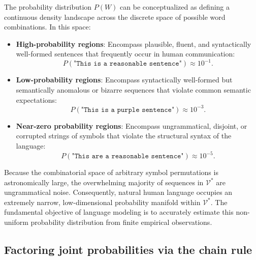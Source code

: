 \documentclass[../../main.tex]{subfiles}
\begin{document}
The probability distribution $P(W)$ can be conceptualized as defining a continuous density landscape across the discrete space of possible word combinations. In this space:
\begin{itemize}
    \item \textbf{High-probability regions}: Encompass plausible, fluent, and syntactically well-formed sentences that frequently occur in human communication:
    \begin{equation}
    P\left(\texttt{"This is a reasonable sentence"}\right) \approx 10^{-1}.
    \end{equation}
    \item \textbf{Low-probability regions}: Encompass syntactically well-formed but semantically anomalous or bizarre sequences that violate common semantic expectations:
    \begin{equation}
    P\left(\texttt{"This is a purple sentence"}\right) \approx 10^{-3}.
    \end{equation}
    \item \textbf{Near-zero probability regions}: Encompass ungrammatical, disjoint, or corrupted strings of symbols that violate the structural syntax of the language:
    \begin{equation}
    P\left(\texttt{"This are a reasonable sentence"}\right) \approx 10^{-5}.
    \end{equation}
\end{itemize}

Because the combinatorial space of arbitrary symbol permutations is astronomically large, the overwhelming majority of sequences in $\mathcal{V}^*$ are ungrammatical noise. Consequently, natural human language occupies an extremely narrow, low-dimensional probability manifold within $\mathcal{V}^*$. The fundamental objective of language modeling is to accurately estimate this non-uniform probability distribution from finite empirical observations.

\subsection{Factoring joint probabilities via the chain rule}
\label{subsec:lm_chain_rule}
\end{document}
